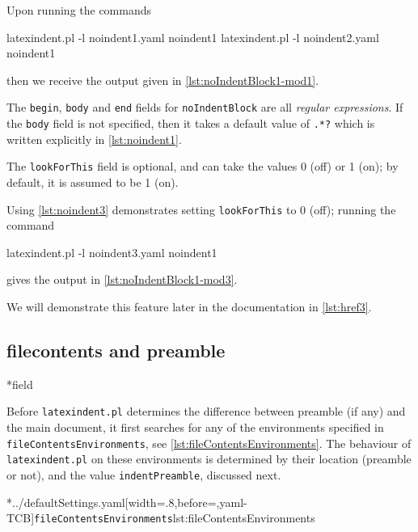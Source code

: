 	Upon running the commands
	\begin{commandshell}
latexindent.pl -l noindent1.yaml noindent1
latexindent.pl -l noindent2.yaml noindent1
\end{commandshell}
	then we receive the output given in \cref{lst:noIndentBlock1-mod1}.


	The \texttt{begin}, \texttt{body} and \texttt{end} fields
	for \texttt{noIndentBlock} are all \emph{regular expressions}. If the
	\texttt{body} field is not specified, then it takes a default value of
	\lstinline!.*?! which is written explicitly in \cref{lst:noindent1}.

	The \texttt{lookForThis} field is optional, and can take the values 0 (off) or 1 (on);
	by default, it is assumed to be 1 (on).

	Using \cref{lst:noindent3} demonstrates setting \texttt{lookForThis} to 0 (off);
	running the command
	\begin{commandshell}
latexindent.pl -l noindent3.yaml noindent1
\end{commandshell}
	gives the output in \cref{lst:noIndentBlock1-mod3}.


	We will demonstrate this feature later in the documentation in \cref{lst:href3}.

\subsection{filecontents and preamble}
*{field}

	Before \texttt{latexindent.pl} determines the difference between preamble (if any) and
	the main document, it first searches for any of the environments specified in
	\texttt{fileContentsEnvironments}, see \cref{lst:fileContentsEnvironments}. The behaviour of
	\texttt{latexindent.pl} on these environments is determined by their location (preamble
	or not), and the value \texttt{indentPreamble}, discussed next.

	\cmhlistingsfromfile[style=fileContentsEnvironments]*{../defaultSettings.yaml}[width=.8\linewidth,before=\centering,yaml-TCB]{\texttt{fileContentsEnvironments}}{lst:fileContentsEnvironments}


